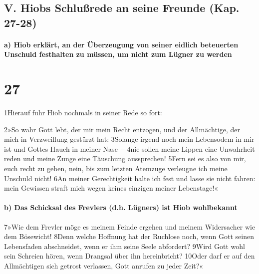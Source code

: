 \hypertarget{v.-hiobs-schluuxdfrede-an-seine-freunde-kap.-27-28}{%
\subsection{V. Hiobs Schlußrede an seine Freunde (Kap.
27-28)}\label{v.-hiobs-schluuxdfrede-an-seine-freunde-kap.-27-28}}

\hypertarget{a-hiob-erkluxe4rt-an-der-uxfcberzeugung-von-seiner-eidlich-beteuerten-unschuld-festhalten-zu-muxfcssen-um-nicht-zum-luxfcgner-zu-werden}{%
\paragraph{a) Hiob erklärt, an der Überzeugung von seiner eidlich
beteuerten Unschuld festhalten zu müssen, um nicht zum Lügner zu
werden}\label{a-hiob-erkluxe4rt-an-der-uxfcberzeugung-von-seiner-eidlich-beteuerten-unschuld-festhalten-zu-muxfcssen-um-nicht-zum-luxfcgner-zu-werden}}

\hypertarget{section-26}{%
\section{27}\label{section-26}}

1Hierauf fuhr Hiob nochmals in seiner Rede so fort:

2»So wahr Gott lebt, der mir mein Recht entzogen, und der Allmächtige,
der mich in Verzweiflung gestürzt hat: 3Solange irgend noch mein
Lebensodem in mir ist und Gottes Hauch in meiner Nase~-- 4nie sollen
meine Lippen eine Unwahrheit reden und meine Zunge eine Täuschung
aussprechen! 5Fern sei es also von mir, euch recht zu geben, nein, bis
zum letzten Atemzuge verleugne ich meine Unschuld nicht! 6An meiner
Gerechtigkeit halte ich fest und lasse sie nicht fahren: mein Gewissen
straft mich wegen keines einzigen meiner Lebenstage!«

\hypertarget{b-das-schicksal-des-frevlers-d.h.-luxfcgners-ist-hiob-wohlbekannt}{%
\paragraph{b) Das Schicksal des Frevlers (d.h. Lügners) ist Hiob
wohlbekannt}\label{b-das-schicksal-des-frevlers-d.h.-luxfcgners-ist-hiob-wohlbekannt}}

7»Wie dem Frevler möge es meinem Feinde ergehen und meinem Widersacher
wie dem Bösewicht! 8Denn welche Hoffnung hat der Ruchlose noch, wenn
Gott seinen Lebensfaden abschneidet, wenn er ihm seine Seele abfordert?
9Wird Gott wohl sein Schreien hören, wenn Drangsal über ihn
hereinbricht? 10Oder darf er auf den Allmächtigen sich getrost
verlassen, Gott anrufen zu jeder Zeit?«

